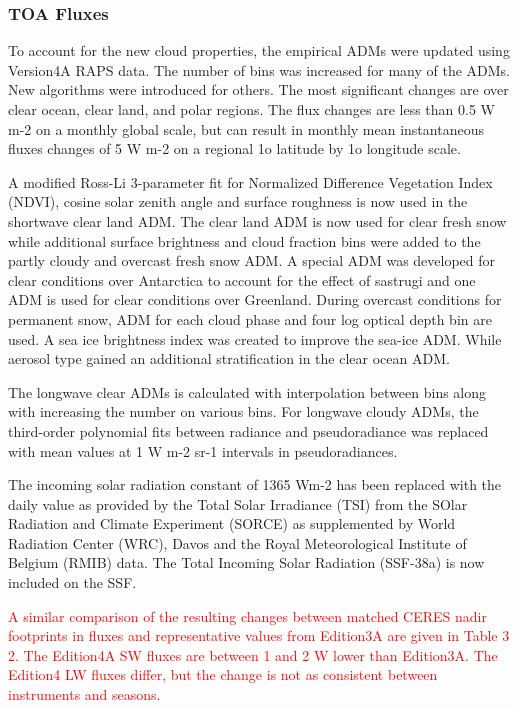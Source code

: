 \documentclass[12pt]{article}
\begin{document}
\subsubsection{TOA Fluxes}
To account for the new cloud properties, the empirical ADMs were updated using Version4A RAPS data. The number of bins was increased for many of the ADMs. New algorithms were introduced for others. The most significant changes are over clear ocean, clear land, and polar regions. The flux changes are less than 0.5 W m-2 on a monthly global scale, but can result in monthly mean instantaneous fluxes changes of 5 W m-2 on a regional 1o latitude by 1o longitude scale.

A modified Ross-Li 3-parameter fit for Normalized Difference Vegetation Index (NDVI), cosine solar zenith angle and surface roughness is now used in the shortwave clear land ADM. The clear land ADM is now used for clear fresh snow while additional surface brightness and cloud fraction bins were added to the partly cloudy and overcast fresh snow ADM.  A special ADM was developed for clear conditions over Antarctica to account for the effect of sastrugi and one ADM is used for clear conditions over Greenland. During overcast conditions for permanent snow, ADM for each cloud phase and four log optical depth bin are used.  A sea ice brightness index was created to improve the sea-ice ADM. While aerosol type gained an additional stratification in the clear ocean ADM.    

The longwave clear ADMs is calculated with interpolation between bins along with increasing the number on various bins. For longwave cloudy ADMs, the third-order polynomial fits between radiance and pseudoradiance was replaced with mean values at 1 W m-2 sr-1 intervals in pseudoradiances.   

The incoming solar radiation constant of 1365 Wm-2 has been replaced with the daily value as provided by the Total Solar Irradiance (TSI) from the SOlar Radiation and Climate Experiment (SORCE) as supplemented by World Radiation Center (WRC), Davos and the Royal Meteorological Institute of Belgium (RMIB) data. The Total Incoming Solar Radiation (SSF-38a) is now included on the SSF.

\textcolor{red} {A similar comparison of the resulting changes between matched CERES nadir footprints in fluxes and representative values from Edition3A are given in Table 3 2. The Edition4A SW fluxes are between 1 and 2 W lower than Edition3A. The Edition4 LW fluxes differ, but the change is not as consistent between instruments and seasons. }
\end{document}
